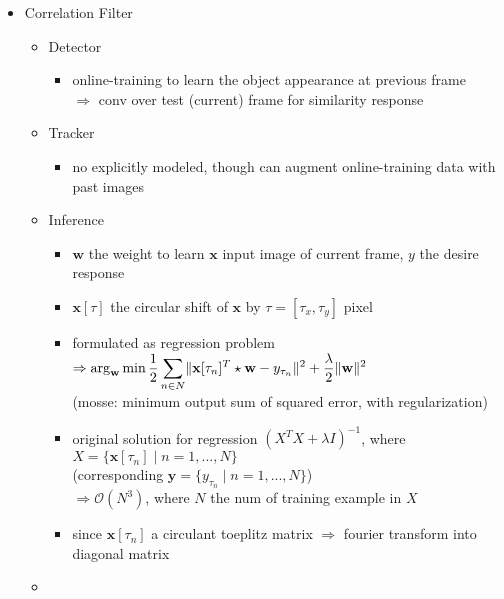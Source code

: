 \begin{itemize}
\item Correlation Filter
	\begin{itemize}
	\item Detector
		\begin{itemize}
		\item online-training to learn the object appearance at previous frame \\
		$\Rightarrow$ conv over test (current) frame for similarity response
		\end{itemize}
	\item Tracker
		\begin{itemize}
		\item no explicitly modeled, though can augment online-training data with past images
		\end{itemize}
	\item Inference
		\begin{itemize}
		\item $\mathbf w$ the weight to learn $\mathbf x$ input image of current frame, $y$ the desire response
		\item $\mathbf x[\tau]$ the circular shift of $\mathbf x$ by $\tau=[\tau_x, \tau_y]$ pixel
		\item formulated as regression problem \\ 
		$\Rightarrow \displaystyle \arg_{\mathbf w}\min\frac 1 2\sum_{n\in N}\lVert\mathbf x[\tau_n]^T\star \mathbf w - y_{\tau_n}\rVert^2 + \frac \lambda 2 \lVert \mathbf w\rVert^2$ \\
		(mosse: minimum output sum of squared error, with regularization)
		\item original solution for regression $(X^T X + \lambda I)^{-1}$, where $X=\{\mathbf x[\tau_n]\mid n = 1,...,N\}$ \\
		(corresponding $\mathbf y = \{y_{\tau_n}\mid n =1,...,N\}$) \\
		$\Rightarrow \mathcal O(N^3)$, where $N$ the num of training example in $X$
		\item since $\mathbf x[\tau_n]$ a circulant toeplitz matrix $\Rightarrow$ fourier transform into diagonal matrix
		\end{itemize}
	\item 
	\end{itemize}


\end{itemize}
